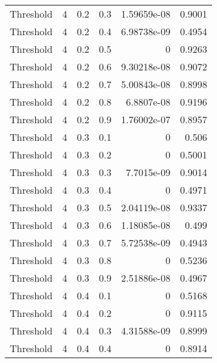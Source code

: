 \documentclass{article}
\begin{document}
\begin{longtable}[H]{lrrrrr}
 Threshold      &       4 &   0.2 &            0.3 &      1.59659e-08 &          0.9001 \\
 Threshold      &       4 &   0.2 &            0.4 &      6.98738e-09 &          0.4954 \\
 Threshold      &       4 &   0.2 &            0.5 &      0           &          0.9263 \\
 Threshold      &       4 &   0.2 &            0.6 &      9.30218e-08 &          0.9072 \\
 Threshold      &       4 &   0.2 &            0.7 &      5.00843e-08 &          0.8998 \\
 Threshold      &       4 &   0.2 &            0.8 &      6.8807e-08  &          0.9196 \\
 Threshold      &       4 &   0.2 &            0.9 &      1.76002e-07 &          0.8957 \\
 Threshold      &       4 &   0.3 &            0.1 &      0           &          0.506  \\
 Threshold      &       4 &   0.3 &            0.2 &      0           &          0.5001 \\
 Threshold      &       4 &   0.3 &            0.3 &      7.7015e-09  &          0.9014 \\
 Threshold      &       4 &   0.3 &            0.4 &      0           &          0.4971 \\
 Threshold      &       4 &   0.3 &            0.5 &      2.04119e-08 &          0.9337 \\
 Threshold      &       4 &   0.3 &            0.6 &      1.18085e-08 &          0.499  \\
 Threshold      &       4 &   0.3 &            0.7 &      5.72538e-09 &          0.4943 \\
 Threshold      &       4 &   0.3 &            0.8 &      0           &          0.5236 \\
 Threshold      &       4 &   0.3 &            0.9 &      2.51886e-08 &          0.4967 \\
 Threshold      &       4 &   0.4 &            0.1 &      0           &          0.5168 \\
 Threshold      &       4 &   0.4 &            0.2 &      0           &          0.9115 \\
 Threshold      &       4 &   0.4 &            0.3 &      4.31588e-09 &          0.8999 \\
 Threshold      &       4 &   0.4 &            0.4 &      0           &          0.8914 \\

\end{longtable}
\end{document}
